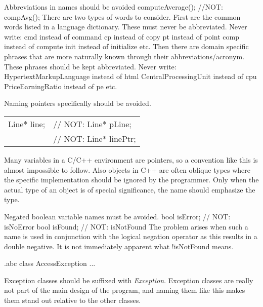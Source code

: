 \recommendation
{Abbreviations in names should be avoided}
{computeAverage(); //NOT: compAvg();}
{
	There are two types of words to consider. First are the common words listed in a language dictionary. These must never be abbreviated. Never write:\newline
	cmd   instead of   command\newline
	cp    instead of   copy\newline
	pt    instead of   point\newline
	comp  instead of   compute\newline
	init  instead of   initialize\newline
	etc.\newline
	Then there are domain specific phrases that are more naturally known through their abbreviations/acronym. These phrases should be kept abbreviated. Never write:\newline
	HypertextMarkupLanguage  instead of   html\newline
	CentralProcessingUnit    instead of   cpu\newline
	PriceEarningRatio        instead of   pe\newline
	etc.
}

\recommendation
{Naming pointers specifically should be avoided.}
{
	\begin{tabularx}{\textwidth}{ll}
		Line* line;&// NOT: Line* pLine;\\
		&// NOT: Line* linePtr;
	\end{tabularx}
}
{Many variables in a C/C++ environment are pointers, so a convention like this is almost impossible to follow. Also objects in C++ are often oblique types where the specific implementation should be ignored by the programmer. Only when the actual type of an object is of special significance, the name should emphasize the type.}

\recommendation
{Negated boolean variable names must be avoided.}
{
	bool isError; // NOT: isNoError\newline
	bool isFound; // NOT: isNotFound
}
{The problem arises when such a name is used in conjunction with the logical negation operator as this results in a double negative. It is not immediately apparent what !isNotFound means.}

\begin{filecontents*}{\jobname.abc}
	class AccessException
	{
		...
	}
\end{filecontents*}

\recommendation
{Exception classes should be suffixed with \textit{Exception}.}
{}
{Exception classes are really not part of the main design of the program, and naming them like this makes them stand out relative to the other classes.}

